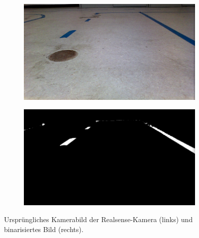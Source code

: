 \documentclass[a4paper,12pt]{report}
\begin{document}
	\begin{figure}
		\centering
		\begin{subfigure}[c]{0.45\textwidth}
			\includegraphics[width=\textwidth]{assets/Strasse.png}
		\end{subfigure}
		\begin{subfigure}[c]{0.45\textwidth}
			\includegraphics[width=\textwidth]{assets/Strasse-Binaer.png}
		\end{subfigure}
		\caption{Ursprüngliches Kamerabild der Realsense-Kamera (links) und binarisiertes Bild (rechts).}
		\label{img-applying-cvtColor}
	\end{figure}
\end{document}
